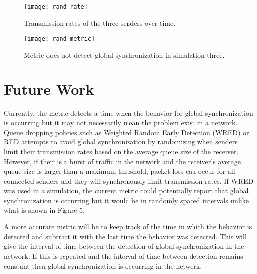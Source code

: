 \documentclass{article}
\begin{document}
\begin{figure}[H]
	\centering
	\texttt{[image: rand-rate]}
	\caption{Transmission rates of the three senders over time.}
\end{figure}

\begin{figure}[H]
	\centering
	\texttt{[image: rand-metric]}
	\caption{Metric does not detect global synchronization in simulation three.}
\end{figure}														
													

\section{Future Work}
Currently, the metric detects a time when the behavior for global synchronization is occurring but it may not necessarily mean the problem exist in a network. Queue dropping policies such as \href{https://en.wikipedia.org/wiki/Weighted_random_early_detection}{Weighted Random Early Detection} (WRED) or RED attempts to avoid global synchronization by randomizing when senders limit their transmission rates based on the average queue size of the receiver. However, if their is a burst of traffic in the network and the receiver's average queue size is larger than a maximum threshold, packet loss can occur for all connected senders and they will synchronously limit transmission rates. If WRED was used in a simulation, the current metric could potentially report that global synchronization is occurring but it would be in randomly spaced intervals unlike what is shown in Figure 5.

A more accurate metric will be to keep track of the time in which the behavior is detected and subtract it with the last time the behavior was detected. This will give the interval of time between the detection of global synchronization in the network. If this is repeated and the interval of time between detection remains constant then global synchronization is occurring in the network.



\end{document}
